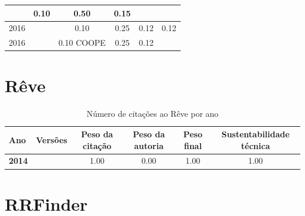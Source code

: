 \begin{table}[H]
\begin{tabular}{| l | c | c | c | c | c |}
          &
          0.10
          &
          0.50
          &
          0.15
          &
          \\
\hline
            2016
          &
          
          &
          0.10
          &
          0.25
          &
          0.12
          &
            {\color{red} 0.12}
          \\
            2016
          &
          
          &
          0.10
            {\tiny COOPE}
          &
          0.25
          &
          0.12
          &
          \\
\hline
\end{tabular}
\end{table}



\section{Rêve}


\begin{table}[H]
\caption{Número de citações ao Rêve por ano}
\centering
\begin{tabular}{| l | c | c | c | c | c |}
  \hline
  Ano & Versões & Peso da citação & Peso da autoria & Peso final & Sustentabilidade técnica \\
  \hline
            {\bf 2014}
          &
          
          &
          1.00
          &
          0.00
          &
          1.00
          &
            {\color{blue} 1.00}
          \\
\hline
\end{tabular}
\end{table}



\section{RRFinder}


